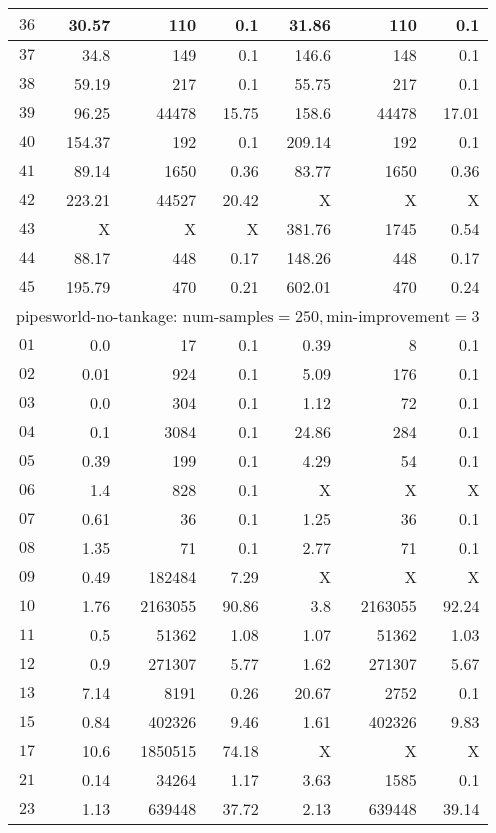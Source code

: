 \begin{longtable}{|c||r|r|r||r|r|r|}
$36$ & 30.57 & 110 & 0.1 &31.86 & 110 & 0.1 \\\hline
$37$ & 34.8 & 149 & 0.1 &146.6 & 148 & 0.1 \\\hline
$38$ & 59.19 & 217 & 0.1 &55.75 & 217 & 0.1 \\\hline
$39$ & 96.25 & 44478 & 15.75 &158.6 & 44478 & 17.01 \\\hline
$40$ & 154.37 & 192 & 0.1 &209.14 & 192 & 0.1 \\\hline
$41$ & 89.14 & 1650 & 0.36 &83.77 & 1650 & 0.36 \\\hline
$42$ & 223.21 & 44527 & 20.42 &X & X & X \\\hline
$43$ & X & X & X &381.76 & 1745 & 0.54 \\\hline
$44$ & 88.17 & 448 & 0.17 &148.26 & 448 & 0.17 \\\hline
$45$ & 195.79 & 470 & 0.21 &602.01 & 470 & 0.24 \\\hline

\multicolumn{7}{|l|}{pipesworld-no-tankage: $\text{num-samples}=250,\text{min-improvement}=3$}\\\hline
$01$ & 0.0 & 17 & 0.1 &0.39 & 8 & 0.1 \\\hline
$02$ & 0.01 & 924 & 0.1 &5.09 & 176 & 0.1 \\\hline
$03$ & 0.0 & 304 & 0.1 &1.12 & 72 & 0.1 \\\hline
$04$ & 0.1 & 3084 & 0.1 &24.86 & 284 & 0.1 \\\hline
$05$ & 0.39 & 199 & 0.1 &4.29 & 54 & 0.1 \\\hline
$06$ & 1.4 & 828 & 0.1 &X & X & X \\\hline
$07$ & 0.61 & 36 & 0.1 &1.25 & 36 & 0.1 \\\hline
$08$ & 1.35 & 71 & 0.1 &2.77 & 71 & 0.1 \\\hline
$09$ & 0.49 & 182484 & 7.29 &X & X & X \\\hline
$10$ & 1.76 & 2163055 & 90.86 &3.8 & 2163055 & 92.24 \\\hline
$11$ & 0.5 & 51362 & 1.08 &1.07 & 51362 & 1.03 \\\hline
$12$ & 0.9 & 271307 & 5.77 &1.62 & 271307 & 5.67 \\\hline
$13$ & 7.14 & 8191 & 0.26 &20.67 & 2752 & 0.1 \\\hline
$15$ & 0.84 & 402326 & 9.46 &1.61 & 402326 & 9.83 \\\hline
$17$ & 10.6 & 1850515 & 74.18 &X & X & X \\\hline
$21$ & 0.14 & 34264 & 1.17 &3.63 & 1585 & 0.1 \\\hline
$23$ & 1.13 & 639448 & 37.72 &2.13 & 639448 & 39.14 \\\hline


\end{longtable}
